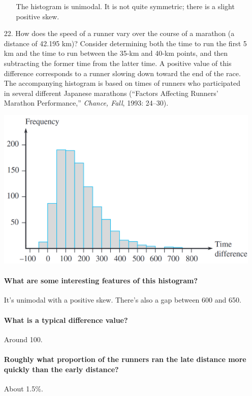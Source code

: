 \documentclass[letterpaper,12pt]{article}
\begin{document}
\begin{enumerate}
\begin{enumerate}
        The histogram is unimodal. It is not quite symmetric; there is a slight positive skew.
    \end{enumerate}
  \item[22.]
    How does the speed of a runner vary over the course of a marathon (a distance of 42.195 km)? Consider determining both the time to run the first 5 km and the time to run between the 35-km and 40-km points, and then subtracting the former time from the latter time. A positive value of this difference corresponds to a runner slowing down toward the end of the race. The accompanying histogram is based on times of runners who participated in several different Japanese marathons (``Factors Affecting Runners’ Marathon Performance,'' \textit{Chance, Fall}, 1993: 24–30).
    \begin{center}
      \includegraphics[scale=0.3]{../resources/01_02_22_01.png}
    \end{center}
    \paragraph{What are some interesting features of this histogram?}
    It's unimodal with a positive skew. There's also a gap between 600 and 650.
    \paragraph{What is a typical difference value?}
    Around 100.
    \paragraph{Roughly what proportion of the runners ran the late distance more quickly than the early distance?}
    About 1.5\%.
\end{enumerate}
\end{document}
